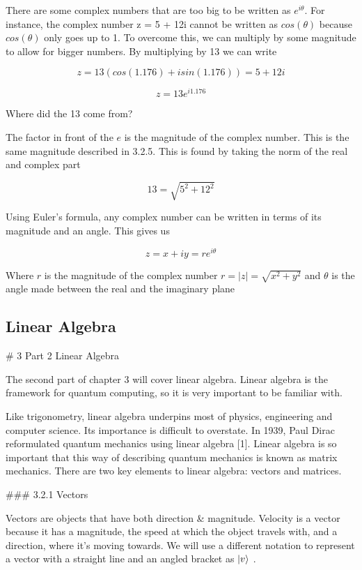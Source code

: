 \documentclass{book}
\begin{document}
There are some complex numbers that are too big to be written as $e^{i\theta}$. For instance, the complex number z = 5 + 12i cannot be written as $cos(\theta)$ because $cos(\theta)$ only goes up to 1. To overcome this, we can multiply by some magnitude to allow for bigger numbers. By multiplying by 13 we can write 

$$ z = 13(cos(1.176) + i sin(1.176) )= 5 + 12i $$

$$ z = 13e^{i 1.176}$$

Where did the 13 come from? 

The factor in front of the $e$ is the magnitude of the complex number. This is the same magnitude described in 3.2.5. This is found by taking the norm of the real and complex part 

$$ 13 = \sqrt{ 5^2 + 12^2} $$


Using Euler's formula, any complex number can be written in terms of its magnitude and an angle. This gives us 

$$z = x + iy = re^{i\theta}$$ 

Where $r$ is the magnitude of the complex number $r = |z| = \sqrt{x^2 + y^2}$ and $\theta$ is the angle made between the real and the imaginary plane



\subsection{Linear Algebra}

# 3 Part 2 Linear Algebra

The second part of chapter 3 will cover linear algebra. Linear algebra is the framework for quantum computing, so it is very important to be familiar with. 

Like trigonometry, linear algebra underpins most of physics, engineering and computer science. Its importance is difficult to overstate. In 1939, Paul Dirac reformulated quantum mechanics using linear algebra [1]. Linear algebra is so important that this way of describing quantum mechanics is known as matrix mechanics. There are two key elements to linear algebra: vectors and matrices. 

### 3.2.1 Vectors

Vectors are objects that have both direction & magnitude. Velocity is a vector because it has a magnitude, the speed at which the object travels with, and a direction, where it's moving towards. We will use a different notation to represent a vector with a straight line and an angled bracket as $ \ket{v} $ .
\end{document}
